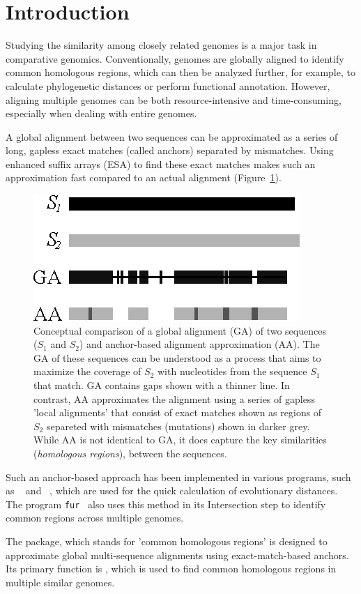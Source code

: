 \section{Introduction}

Studying the similarity among closely related genomes is a major task
in comparative genomics. Conventionally, genomes are globally aligned
to identify common homologous regions, which can then be analyzed
further, for example, to calculate phylogenetic distances or perform
functional annotation. However, aligning multiple genomes can be both
resource-intensive and time-consuming, especially when dealing with
entire genomes.

A global alignment between two sequences can be approximated as a
series of long, gapless exact matches (called anchors) separated by
mismatches. Using enhanced suffix arrays (ESA) to find these exact
matches makes such an approximation fast compared to an actual
alignment (Figure~\ref{fig:Intro1}).

\begin{figure}[H]
  \centering
    \includegraphics[width=0.5\linewidth]{figIntro1.eps}
    \caption{Conceptual comparison of a global alignment (GA) of two
      sequences ($S_1$ and $S_2$) and anchor-based alignment
      approximation (AA). The GA of these sequences can be understood
      as a process that aims to maximize the coverage of $S_2$ with
      nucleotides from the sequence $S_1$ that match. GA contains gaps
      shown with a thinner line. In contrast, AA approximates the
      alignment using a series of gapless 'local alignments' that
      consist of exact matches shown as regions of $S_2$ separeted
      with mismatches (mutations) shown in darker grey. While AA is
      not identical to GA, it does capture the key similarities
      (\textit{homologous regions}), between the sequences.}
    \label{fig:Intro1}
\end{figure}

Such an anchor-based approach has been implemented in various
programs, such as ~\cite{hau15:and} and
~\cite{kloe19:phy}, which are used for the quick
calculation of evolutionary distances. The program
\texttt{fur}~\cite{hau21:fur} also uses this method in its
Intersection step to identify common regions across multiple genomes.

The  package, which stands for 'common homologous regions' is
designed to approximate global multi-sequence alignments using
exact-match-based anchors. Its primary function is ,
which is used to find common homologous regions in multiple similar
genomes.
\newpage
